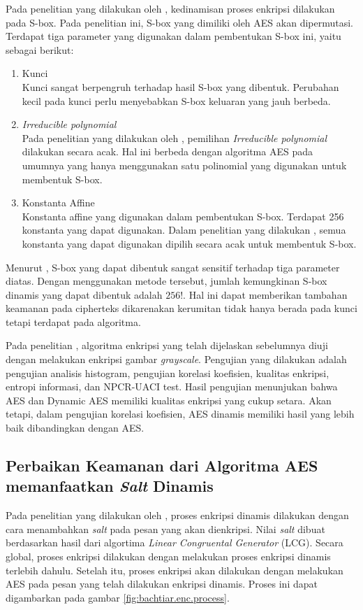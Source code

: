 Pada penelitian yang dilakukan oleh \textcite{singh2019}, kedinamisan proses enkripsi dilakukan pada S-box. Pada penelitian ini, S-box yang dimiliki oleh AES akan dipermutasi. Terdapat tiga parameter yang digunakan dalam pembentukan S-box ini, yaitu sebagai berikut:
\begin{enumerate}
  \item Kunci\\ Kunci sangat berpengruh terhadap hasil S-box yang dibentuk. Perubahan kecil pada kunci perlu menyebabkan S-box keluaran yang jauh berbeda.
  \item \emph{Irreducible polynomial}\\ Pada penelitian yang dilakukan oleh \textcite{singh2019}, pemilihan \emph{Irreducible polynomial} dilakukan secara acak. Hal ini berbeda dengan algoritma AES pada umumnya yang hanya menggunakan satu polinomial yang digunakan untuk membentuk S-box.
  \item Konstanta Affine\\ Konstanta affine yang digunakan dalam pembentukan S-box. Terdapat 256 konstanta yang dapat digunakan. Dalam penelitian yang dilakukan \textcite{singh2019}, semua konstanta yang dapat digunakan dipilih secara acak untuk membentuk S-box.
\end{enumerate}

Menurut \textcite{singh2019}, S-box yang dapat dibentuk sangat sensitif terhadap tiga parameter diatas. Dengan menggunakan metode tersebut, jumlah kemungkinan S-box dinamis yang dapat dibentuk adalah $256!$. Hal ini dapat memberikan tambahan keamanan pada cipherteks dikarenakan kerumitan tidak hanya berada pada kunci tetapi terdapat pada algoritma.

Pada penelitian \textcite{singh2019}, algoritma enkripsi yang telah dijelaskan sebelumnya diuji dengan melakukan enkripsi gambar \emph{grayscale}. Pengujian yang dilakukan adalah pengujian analisis histogram, pengujian korelasi koefisien, kualitas enkripsi, entropi informasi, dan NPCR-UACI test. Hasil pengujian menunjukan bahwa AES dan Dynamic AES memiliki kualitas enkripsi yang cukup setara. Akan tetapi, dalam pengujian korelasi koefisien, AES dinamis memiliki hasil yang lebih baik dibandingkan dengan AES.

\subsection{Perbaikan Keamanan dari Algoritma AES memanfaatkan \emph{Salt} Dinamis}
Pada penelitian yang dilakukan oleh \textcite{bachtiar2018}, proses enkripsi dinamis dilakukan dengan cara menambahkan \emph{salt} pada pesan yang akan dienkripsi. Nilai \emph{salt} dibuat berdasarkan hasil dari algortima \emph{Linear Congruental Generator} (LCG). Secara global, proses enkripsi dilakukan dengan melakukan proses enkripsi dinamis terlebih dahulu. Setelah itu, proses enkripsi akan dilakukan dengan melakukan AES pada pesan yang telah dilakukan enkripsi dinamis. Proses ini dapat digambarkan pada gambar \ref{fig:bachtiar.enc.process}.

